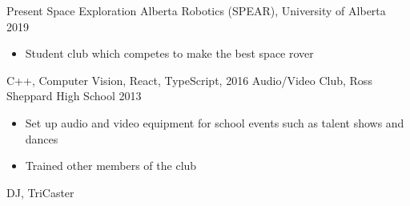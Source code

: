
\begin{experiences}
  \experience
    {Present}   {Space Exploration Alberta Robotics (SPEAR), }{University of Alberta}{}
    {2019} {
                      \begin{itemize}
                        \item Student club which competes to make the best space rover
                      \end{itemize}
                    }
                    {
                        C++,
                        Computer Vision,
                        React,
                        TypeScript,
                    }
  \experience
  {2016}   {Audio/Video Club, }{Ross Sheppard High School}{}
  {2013} {
                    \begin{itemize}
                      \item Set up audio and video equipment for school events such as talent shows and dances
                      \item Trained other members of the club
                    \end{itemize}
                  }
                  {
                      DJ,
                      TriCaster
                  }

\end{experiences}